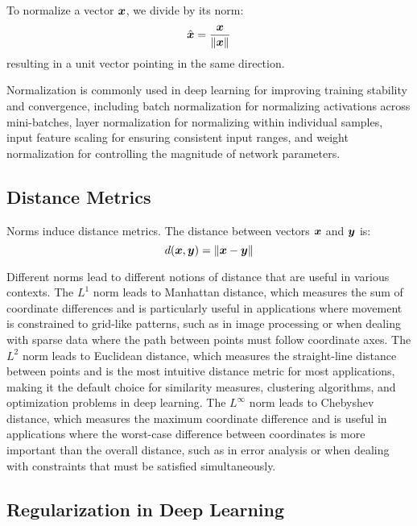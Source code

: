 \begin{definition}[Normalization]
To normalize a vector $\boldsymbol{x}$, we divide by its norm:
\begin{equation}
    \hat{\boldsymbol{x}} = \frac{\boldsymbol{x}}{\left\lVert\boldsymbol{x}\right\rVert}
\end{equation}
resulting in a unit vector pointing in the same direction.
\end{definition}

Normalization is commonly used in deep learning for improving training stability and convergence, including batch normalization for normalizing activations across mini-batches, layer normalization for normalizing within individual samples, input feature scaling for ensuring consistent input ranges, and weight normalization for controlling the magnitude of network parameters.

\subsection{Distance Metrics}

Norms induce distance metrics. The distance between vectors $\boldsymbol{x}$ and $\boldsymbol{y}$ is:
\begin{equation}
    d(\boldsymbol{x}, \boldsymbol{y}) = \left\lVert\boldsymbol{x} - \boldsymbol{y}\right\rVert
\end{equation}

Different norms lead to different notions of distance that are useful in various contexts. The $L^1$ norm leads to Manhattan distance, which measures the sum of coordinate differences and is particularly useful in applications where movement is constrained to grid-like patterns, such as in image processing or when dealing with sparse data where the path between points must follow coordinate axes. The $L^2$ norm leads to Euclidean distance, which measures the straight-line distance between points and is the most intuitive distance metric for most applications, making it the default choice for similarity measures, clustering algorithms, and optimization problems in deep learning. The $L^\infty$ norm leads to Chebyshev distance, which measures the maximum coordinate difference and is useful in applications where the worst-case difference between coordinates is more important than the overall distance, such as in error analysis or when dealing with constraints that must be satisfied simultaneously.

\subsection{Regularization in Deep Learning}

